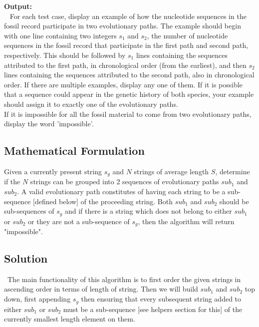 \documentclass[12pt]{article}
\begin{document}
\noindent \textbf{Output:} \\
~ \indent For each test case, display an example of how the nucleotide sequences in the fossil record participate in
two evolutionary paths. The example should begin with one line containing two integers $s_1$ and $s_2$, the
number of nucleotide sequences in the fossil record that participate in the first path and second path,
respectively. This should be followed by $s_1$ lines containing the sequences attributed to the first path,
in chronological order (from the earliest), and then $s_2$ lines containing the sequences attributed to the
second path, also in chronological order. If there are multiple examples, display any one of them. If
it is possible that a sequence could appear in the genetic history of both species, your example should
assign it to exactly one of the evolutionary paths. \\
\indent If it is impossible for all the fossil material to come from two evolutionary paths, display the word
'impossible'.




\subsection{Mathematical Formulation}
Given a currently present string $s_g$ and $N$ strings of average length $S$, determine if the $N$ strings can be
grouped into 2 sequences of evolutionary paths $sub_1$ and $sub_2$. A valid evolutionary path constitutes of having
each string to be a sub-sequence [defined below] of the proceeding string. Both $sub_1$ and $sub_2$ should be
sub-sequences of $s_g$ and if there is a string which does not belong to either $sub_1$ or $sub_2$ or they are not
a sub-sequence of $s_g$, then the algorithm will return "impossible".


\newpage
\subsection{Solution}
~\indent The main functionality of this algorithm is to first order the given strings in ascending order in terms
of length of string. Then we will build $sub_1$ and $sub_2$ top down, first appending $s_g$ then ensuring that every
subsequent string added to either $sub_1$ or $sub_2$ must be a sub-sequence [see helpers section for this] of the
currently smallest length element on them.
\end{document}

